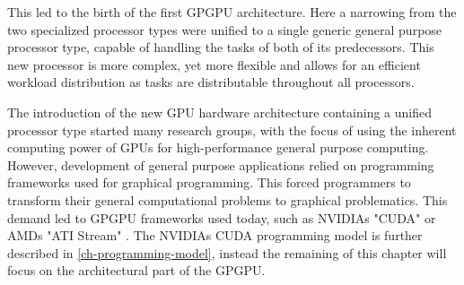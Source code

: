 This led to the birth of the first GPGPU architecture. 
Here a narrowing from the two specialized processor types were unified to a single generic general purpose processor type, capable of handling the tasks of both of its predecessors.
This new processor is more complex, yet more flexible and allows for an efficient workload distribution as tasks are distributable throughout all processors.

The introduction of the new GPU hardware architecture containing a unified processor type started many research groups, with the focus of using the inherent computing power of GPUs for high-performance general purpose computing.
However, development of general purpose applications relied on programming frameworks used for graphical programming.
This forced programmers to transform their general computational problems to graphical problematics.
This demand led to GPGPU frameworks used today, such as NVIDIAs "CUDA" or AMDs "ATI Stream" \cite{Johansson2010}.
The NVIDIAs CUDA programming model is further described in \cref{ch-programming-model}, instead the remaining of this chapter will focus on the architectural part of the GPGPU.